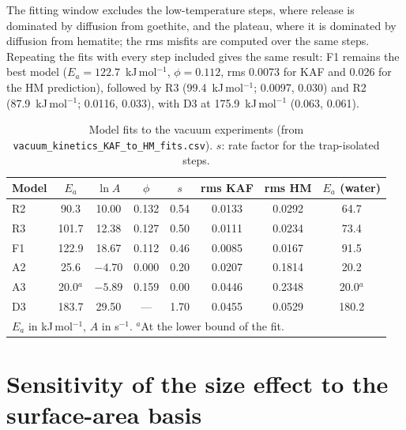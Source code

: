 The fitting window excludes the low-temperature steps, where release is dominated by diffusion from
goethite, and the plateau, where it is dominated by diffusion from hematite; the rms misfits are
computed over the same steps. Repeating the fits with every step included gives the same result:
F1 remains the best model ($E_a = 122.7$~kJ\,mol$^{-1}$, $\phi = 0.112$, rms 0.0073 for KAF and 0.026
for the HM prediction), followed by R3 (99.4~kJ\,mol$^{-1}$; 0.0097, 0.030) and R2 (87.9~kJ\,mol$^{-1}$;
0.0116, 0.033), with D3 at 175.9~kJ\,mol$^{-1}$ (0.063, 0.061).

\begin{table}
  \centering
  \caption{Model fits to the vacuum experiments (from \texttt{vacuum\_kinetics\_KAF\_to\_HM\_fits.csv}). $s$: rate factor for the trap-isolated steps.}
  \label{tab:gt_mech_fits}
  \begin{tabular}{lccccccc}
    \hline
    Model & $E_a$ & $\ln A$ & $\phi$ & $s$ & rms KAF & rms HM & $E_a$ (water) \\
    \hline
    R2 & 90.3 & 10.00 & 0.132 & 0.54 & 0.0133 & 0.0292 & 64.7 \\
    R3 & 101.7 & 12.38 & 0.127 & 0.50 & 0.0111 & 0.0234 & 73.4 \\
    F1 & 122.9 & 18.67 & 0.112 & 0.46 & 0.0085 & 0.0167 & 91.5 \\
    A2 & 25.6 & $-4.70$ & 0.000 & 0.20 & 0.0207 & 0.1814 & 20.2 \\
    A3 & 20.0$^{a}$ & $-5.89$ & 0.159 & 0.00 & 0.0446 & 0.2348 & 20.0$^{a}$ \\
    D3 & 183.7 & 29.50 & --- & 1.70 & 0.0455 & 0.0529 & 180.2 \\
    \hline
    \multicolumn{8}{l}{\footnotesize $E_a$ in kJ\,mol$^{-1}$, $A$ in s$^{-1}$. $^{a}$At the lower bound of the fit.}
  \end{tabular}
\end{table}


\section{Sensitivity of the size effect to the surface-area basis}
\label{sec:gt_supp_basis}


